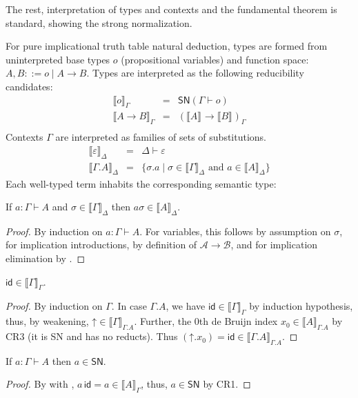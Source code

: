 \documentclass[a4paper,USenglish,cleveref, autoref, thm-restate]{lipics-v2019}
\newcommand{\den}[2][]{\llbracket#2\rrbracket^{#1}}
\newcommand{\tid}{\mathsf{id}}
\newcommand{\Den}[2]{\den{#1}_{#2}}
\newcommand{\Ge}{\ensuremath{\varepsilon}}
\newcommand{\Gs}{\ensuremath{\sigma}}
\newcommand{\A}{\mathcal{A}}
\newcommand{\B}{\mathcal{B}}
\newcommand{\SN}{\mathsf{SN}}
\newcommand{\up}{\mathord{\uparrow}}
\begin{document}
The rest, interpretation of types and contexts and the fundamental
theorem is standard, showing the strong normalization.

For pure implicational truth table natural deduction, types are formed
from uninterpreted base types $o$ (propositional variables) and
function space: $A,B ::= o \mid A \to B$.  Types are interpreted as
the following reducibility candidates:
\[
\begin{array}{lll}
  \Den o \Gamma & = & \SN(\Gamma \vdash o) \\
  \Den{A \to B} \Gamma & = & (\den A \to \den B)_\Gamma \\
\end{array}
\]
Contexts $\Gamma$ are interpreted as families of sets of
substitutions.
\[
  \begin{array}{lll}
\Den \Ge \Delta & = & \Delta \vdash \Ge \\
\Den{\Gamma.A} \Delta & = & \{ \Gs.a \mid \Gs \in \Den \Gamma \Delta
                            \mbox{ and } a \in \Den A \Delta \}
  \end{array}
\]
Each well-typed term inhabits the corresponding semantic type:
\begin{theorem}
  \label{thm:fund}
  If $a : \Gamma \vdash A$ and $\Gs \in \Den \Gamma \Delta$ then $a
  \sigma \in \Den A \Delta$.
\end{theorem}
\begin{proof}
  By induction on $a : \Gamma \vdash A$.
  For variables, this follows by assumption on $\Gs$, for implication
  introductions, by definition of $\A \to \B$, and for implication
  elimination by .
\end{proof}

\begin{lemma}
  \label{lem:id}
  $\tid \in \Den \Gamma \Gamma$.
\end{lemma}
\begin{proof}
  By induction on $\Gamma$.  In case $\Gamma.A$, we have
  $\tid \in \Den \Gamma \Gamma$ by induction hypothesis, thus, by
  weakening, ${\up} \in \Den\Gamma{\Gamma.A}$.  Further, the 0th de
  Bruijn index $x_0 \in \Den A {\Gamma.A}$ by CR3 (it is SN and has no
  reducts).  Thus $(\up.x_0) = \tid \in \Den{\Gamma.A}{\Gamma.A}$.
\end{proof}

\begin{corollary}
  If $a : \Gamma \vdash A$ then $a \in \SN$.
\end{corollary}
\begin{proof}
  By  with , $a\, \tid = a \in \Den A
  \Gamma$, thus, $a \in \SN$ by CR1.
\end{proof}
\end{document}
